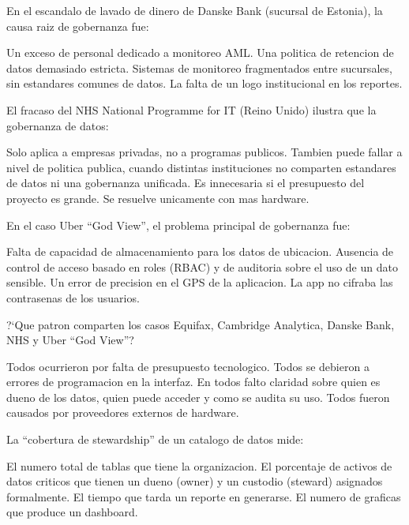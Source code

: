 \documentclass[12pt,addpoints]{exam}
\begin{document}
\begin{questions}
\question[1] En el escandalo de lavado de dinero de Danske Bank (sucursal de
Estonia), la causa raiz de gobernanza fue:
\begin{choices}
  \choice Un exceso de personal dedicado a monitoreo AML.
  \choice Una politica de retencion de datos demasiado estricta.
  \CorrectChoice Sistemas de monitoreo fragmentados entre sucursales, sin
    estandares comunes de datos.
  \choice La falta de un logo institucional en los reportes.
\end{choices}

\question[1] El fracaso del NHS National Programme for IT (Reino Unido)
ilustra que la gobernanza de datos:
\begin{choices}
  \choice Solo aplica a empresas privadas, no a programas publicos.
  \CorrectChoice Tambien puede fallar a nivel de politica publica, cuando
    distintas instituciones no comparten estandares de datos ni una
    gobernanza unificada.
  \choice Es innecesaria si el presupuesto del proyecto es grande.
  \choice Se resuelve unicamente con mas hardware.
\end{choices}

\question[1] En el caso Uber ``God View'', el problema principal de
gobernanza fue:
\begin{choices}
  \choice Falta de capacidad de almacenamiento para los datos de ubicacion.
  \CorrectChoice Ausencia de control de acceso basado en roles (RBAC) y de
    auditoria sobre el uso de un dato sensible.
  \choice Un error de precision en el GPS de la aplicacion.
  \choice La app no cifraba las contrasenas de los usuarios.
\end{choices}

\question[1] ?`Que patron comparten los casos Equifax, Cambridge Analytica,
Danske Bank, NHS y Uber ``God View''?
\begin{choices}
  \choice Todos ocurrieron por falta de presupuesto tecnologico.
  \choice Todos se debieron a errores de programacion en la interfaz.
  \CorrectChoice En todos falto claridad sobre quien es dueno de los datos,
    quien puede acceder y como se audita su uso.
  \choice Todos fueron causados por proveedores externos de hardware.
\end{choices}

\question[1] La ``cobertura de stewardship'' de un catalogo de datos mide:
\begin{choices}
  \choice El numero total de tablas que tiene la organizacion.
  \CorrectChoice El porcentaje de activos de datos criticos que tienen un
    dueno (owner) y un custodio (steward) asignados formalmente.
  \choice El tiempo que tarda un reporte en generarse.
  \choice El numero de graficas que produce un dashboard.
\end{choices}


\end{questions}
\end{document}
